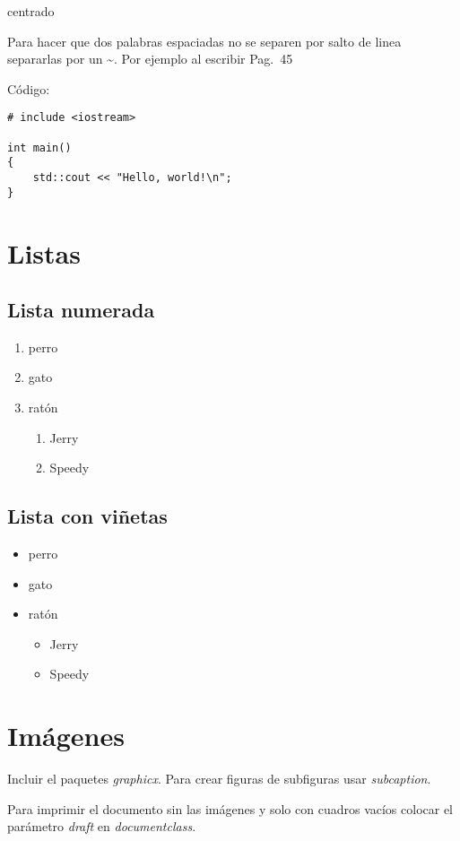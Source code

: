 \documentclass[12pt, a4paper,twoside]{article} %
\begin{document}
\begin{center}
centrado %
\end{center}

Para hacer que dos palabras espaciadas no se separen por salto de linea separarlas por un \textasciitilde{}. Por ejemplo al escribir Pag.~45

Código:
\begin{lstlisting}
# include <iostream>
 
int main()
{
	std::cout << "Hello, world!\n";
}
\end{lstlisting}

\section{Listas}
\subsection{Lista numerada}
\begin{enumerate}
\item perro
\item gato
\item ratón
	\begin{enumerate}
	\item Jerry
	\item Speedy
	\end{enumerate}
\end{enumerate}
\subsection{Lista con viñetas}
\begin{itemize}
\item perro
\item gato
\item ratón
	\begin{itemize}
	\item Jerry
	\item Speedy
	\end{itemize}
\end{itemize}

\section{Imágenes}
Incluir el paquetes \emph{graphicx}. Para crear figuras de subfiguras usar \emph{subcaption}. 

Para imprimir el documento sin las imágenes y solo con cuadros vacíos colocar el parámetro \emph{draft} en \emph{documentclass}. 
\end{document}
